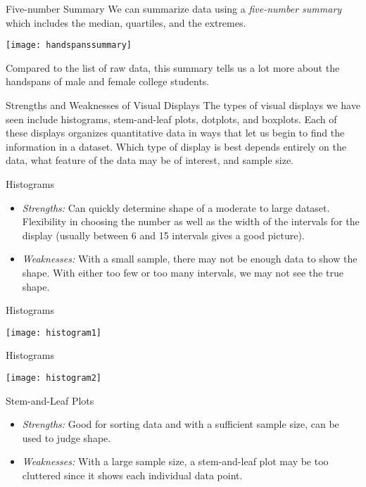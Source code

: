 \documentclass[Lecture.tex]{subfiles}
\begin{document}
\begin{frame}{Five-number Summary}
We can summarize data using a {\it five-number summary} which includes the median, quartiles, and the extremes.\pause
\begin{center}
\texttt{[image: handspanssummary]}
\end{center}\pause
Compared to the list of raw data, this summary tells us a lot more about the handspans of male and female college students.
\end{frame}

\begin{frame}{Strengths and Weaknesses of Visual Displays}
The types of visual displays we have seen include histograms, stem-and-leaf plots, dotplots, and boxplots.  Each of these displays organizes quantitative data in ways that let us begin to find the information in a dataset.  Which type of display is best depends entirely on the data, what feature of the data may be of interest, and sample size.
\end{frame}

\begin{frame}{Histograms}
\begin{itemize}
\item<1->
  {\it Strengths:} Can quickly determine shape of a moderate to large dataset.  Flexibility in choosing the number as well as the width of the intervals for the display (usually between 6 and 15 intervals gives a good picture).
\item<2->
  {\it Weaknesses:} With a small sample, there may not be enough data to show the shape.  With either too few or too many intervals, we may not see the true shape.
\end{itemize}
\end{frame}
\begin{frame}{Histograms}
\begin{center}
\texttt{[image: histogram1]}
\end{center}
\end{frame}

\begin{frame}{Histograms}
\begin{center}
\texttt{[image: histogram2]}
\end{center}
\end{frame}

\begin{frame}{Stem-and-Leaf Plots}
\begin{itemize}
\item<1->
  {\it Strengths:} Good for sorting data and with a sufficient sample size, can be used to judge shape.
\item<2->
  {\it Weaknesses:} With a large sample size, a stem-and-leaf plot may be too cluttered since it shows each individual data point.
\end{itemize}
\end{frame}
\end{document}
